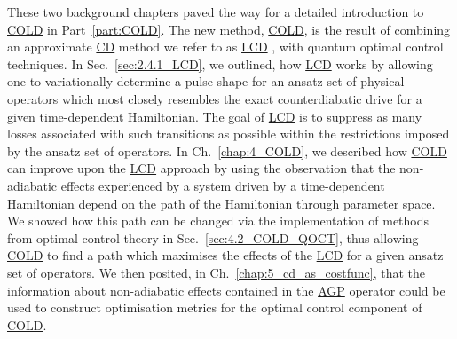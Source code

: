 \documentclass[a4paper,oneside,11pt]{book}
\newcommand{\acrref}[1]{\hyperref[acr:#1]{#1}}
\begin{document}
These two background chapters paved the way for a detailed introduction to \acrref{COLD} in Part~\ref{part:COLD}. The new method, \acrref{COLD}, is the result of combining an approximate \acrref{CD} method we refer to as \acrref{LCD} \cite{sels_minimizing_2017}, with quantum optimal control techniques. In Sec.~\ref{sec:2.4.1_LCD}, we outlined, how \acrref{LCD} works by allowing one to variationally determine a pulse shape for an ansatz set of physical operators which most closely resembles the exact counterdiabatic drive for a given time-dependent Hamiltonian. The goal of \acrref{LCD} is to suppress as many losses associated with such transitions as possible within the restrictions imposed by the ansatz set of operators. In Ch.~\ref{chap:4_COLD}, we described how \acrref{COLD} can improve upon the \acrref{LCD} approach by using the observation that the non-adiabatic effects experienced by a system driven by a time-dependent Hamiltonian depend on the path of the Hamiltonian through parameter space. We showed how this path can be changed via the implementation of methods from optimal control theory in Sec.~\ref{sec:4.2_COLD_QOCT}, thus allowing \acrref{COLD} to find a path which maximises the effects of the \acrref{LCD} for a given ansatz set of operators. We then posited, in Ch.~\ref{chap:5_cd_as_costfunc}, that the information about non-adiabatic effects contained in the \acrref{AGP} operator could be used to construct optimisation metrics for the optimal control component of \acrref{COLD}.
\end{document}
